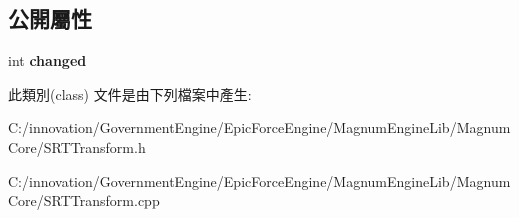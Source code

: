 \subsection*{公開屬性}
\begin{DoxyCompactItemize}
\item 
int {\bfseries changed}\hypertarget{class_i_dream_sky_1_1_s_r_t_transform_a3cf1cf16342def95b77651ef007575c2}{}\label{class_i_dream_sky_1_1_s_r_t_transform_a3cf1cf16342def95b77651ef007575c2}

\end{DoxyCompactItemize}


此類別(class) 文件是由下列檔案中產生\+:\begin{DoxyCompactItemize}
\item 
C\+:/innovation/\+Government\+Engine/\+Epic\+Force\+Engine/\+Magnum\+Engine\+Lib/\+Magnum\+Core/S\+R\+T\+Transform.\+h\item 
C\+:/innovation/\+Government\+Engine/\+Epic\+Force\+Engine/\+Magnum\+Engine\+Lib/\+Magnum\+Core/S\+R\+T\+Transform.\+cpp\end{DoxyCompactItemize}

